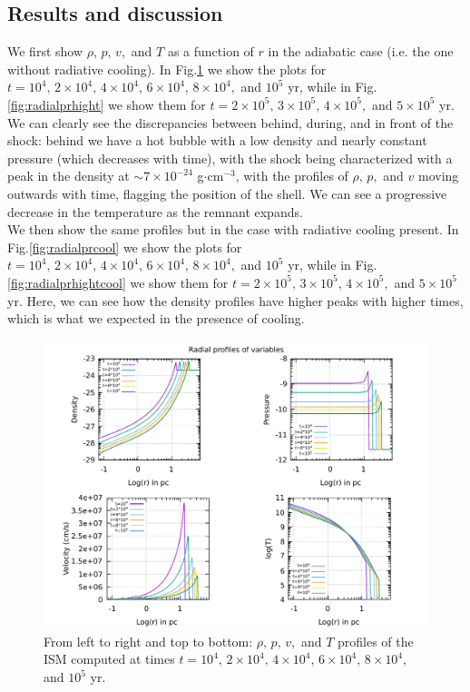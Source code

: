 \documentclass{article}
\begin{document}
\subsection{Results and discussion}
We first show $\rho,\,p,\,v,$ and $T$ as a function of $r$ in the adiabatic case (i.e. the one without radiative cooling). In Fig.\ref{fig:radialpr} we show the plots for $t=10^4,\,2\times10^4,\,4\times10^4,\,6\times10^4,\,8\times 10^4,$ and $10^5$ yr, while in Fig.\ref{fig:radialprhight} we show them for 
$t=2\times10^5,\,3\times10^5,\,4\times10^5,$ and $5\times10^5$ yr. We can clearly see the discrepancies between behind, during, and in front of the shock: behind we have a hot bubble with a low density and nearly constant pressure (which decreases with time), with the shock being characterized with a peak in the density at $\sim 7\times 10^{-24}$ g$\cdot$cm$^{-3}$,
with the profiles of $\rho,\,p,$ and $v$ moving outwards with time, flagging the position of the shell. We can see a progressive decrease in the temperature as the remnant expands.\\
We then show the same profiles but in the case with radiative cooling present. In Fig.\ref{fig:radialprcool} we show the plots for $t=10^4,\,2\times10^4,\,4\times10^4,\,6\times10^4,\,8\times 10^4,$ and $10^5$ yr, while in Fig.\ref{fig:radialprhightcool} we show them for 
$t=2\times10^5,\,3\times10^5,\,4\times10^5,$ and $5\times10^5$ yr. Here, we can see how the density profiles have higher peaks with higher times, which is what we expected in the presence of cooling. \\
\begin{figure}[H] 
	\centering
	\includegraphics[width=1 \linewidth]{radialprofiles.pdf}
	\caption{From left to right and top to bottom: $\rho,\,p,\,v,$ and $T$ profiles of the ISM computed at times $t=10^4,\,2\times10^4,\,4\times10^4,\,6\times10^4,\,8\times 10^4,$ and $10^5$ yr.}

	\label{fig:radialpr}
\end{figure}
\end{document}
